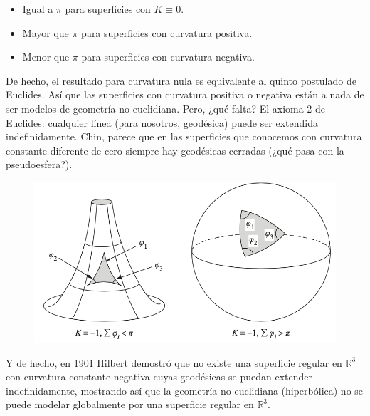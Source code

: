 \documentclass[spanish]{book}
\theoremstyle{definition}
\newcommand{\R}{\mathbb{R}}
\begin{document}
\begin{itemize}
	\item Igual a $\pi$ para superficies con $K\equiv0$.
	\item Mayor que $\pi$ para superficies con curvatura positiva.
	\item Menor que $\pi$ para superficies con curvatura negativa.
\end{itemize}
De hecho, el resultado para curvatura nula es equivalente al quinto postulado de Euclides. Así que las superficies con curvatura positiva o negativa están a nada de ser modelos de geometría no euclidiana. Pero, ¿qué falta? El axioma 2 de Euclides: cualquier línea (para nosotros, geodésica) puede ser extendida indefinidamente. Chin, parece que en las superficies que conocemos con curvatura constante diferente de cero siempre hay geodésicas cerradas (¿qué pasa con la pseudoesfera?).
\begin{figure}
	\centering
	\includegraphics[width=0.7\linewidth]{gauss17}
\end{figure}
Y de hecho, en 1901 Hilbert demostró que no existe una superficie regular en $\R^3$ con curvatura constante negativa cuyas geodésicas se puedan extender indefinidamente, mostrando así que la geometría no euclidiana (hiperbólica) no se puede modelar globalmente por una superficie regular en $\R^3$.
\end{document}
